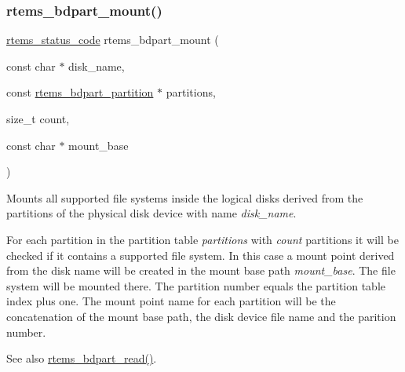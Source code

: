 \subsubsection{\texorpdfstring{rtems\_bdpart\_mount()}{rtems\_bdpart\_mount()}}
{\footnotesize\ttfamily \mbox{\hyperlink{group__ClassicStatus_ga545d41846817eaba6143d52ee4d9e9fe}{rtems\+\_\+status\+\_\+code}} rtems\+\_\+bdpart\+\_\+mount (\begin{DoxyParamCaption}\item[{const char $\ast$}]{disk\+\_\+name,  }\item[{const \mbox{\hyperlink{structrtems__bdpart__partition}{rtems\+\_\+bdpart\+\_\+partition}} $\ast$}]{partitions,  }\item[{size\+\_\+t}]{count,  }\item[{const char $\ast$}]{mount\+\_\+base }\end{DoxyParamCaption})}



Mounts all supported file systems inside the logical disks derived from the partitions of the physical disk device with name {\itshape disk\+\_\+name}. 

For each partition in the partition table {\itshape partitions} with {\itshape count} partitions it will be checked if it contains a supported file system. In this case a mount point derived from the disk name will be created in the mount base path {\itshape mount\+\_\+base}. The file system will be mounted there. The partition number equals the partition table index plus one. The mount point name for each partition will be the concatenation of the mount base path, the disk device file name and the parition number.

\begin{DoxySeeAlso}{See also}
\mbox{\hyperlink{group__rtems__bdpart_ga1ffdc1b7fc86d324faa9b93500ab0e63}{rtems\+\_\+bdpart\+\_\+read()}}. 
\end{DoxySeeAlso}
\mbox{\label{group__rtems__bdpart_ga1ffdc1b7fc86d324faa9b93500ab0e63}} 
